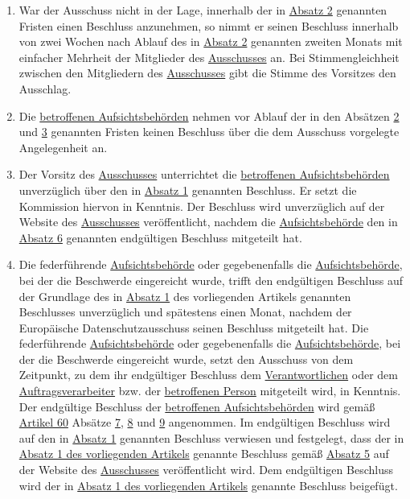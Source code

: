\begin{enumerate}
  \item War der Ausschuss nicht in der Lage, innerhalb der in \hyperref[itm:65-2]{Absatz 2} genannten Fristen einen
   Beschluss anzunehmen, so nimmt er seinen Beschluss innerhalb von zwei Wochen nach Ablauf des in \hyperref[itm:65-2]
   {Absatz 2} genannten zweiten Monats mit einfacher Mehrheit der Mitglieder des \hyperref[ch:68]{Ausschusses} an. Bei Stimmengleichheit
   zwischen den Mitgliedern des \hyperref[ch:68]{Ausschusses} gibt die Stimme des Vorsitzes den Ausschlag.%
  \label{itm:65-3}

  \item Die \hyperref[itm:04-22]{betroffenen Aufsichtsbehörden} nehmen vor Ablauf der in den Absätzen \hyperref
   [itm:65-2]{2} und \hyperref[itm:65-3]{3} genannten Fristen keinen Beschluss über die dem Ausschuss vorgelegte
   Angelegenheit an.%
  \label{itm:65-4}

  \item Der Vorsitz des \hyperref[ch:68]{Ausschusses} unterrichtet die \hyperref[itm:04-22]{betroffenen Aufsichtsbehörden} unverzüglich
   über den in \hyperref[itm:65-1]{Absatz 1} genannten Beschluss. Er setzt die Kommission hiervon in Kenntnis. Der
   Beschluss wird unverzüglich auf der Website des \hyperref[ch:68]{Ausschusses} veröffentlicht, nachdem die \hyperref[itm:04-21]
   {Aufsichtsbehörde} den in \hyperref[itm:65-6]{Absatz 6} genannten endgültigen Beschluss mitgeteilt hat.%
  \label{itm:65-5}

  \item Die federführende \hyperref[itm:04-21]{Aufsichtsbehörde} oder gegebenenfalls die \hyperref[itm:04-21]
   {Aufsichtsbehörde}, bei der die Beschwerde eingereicht wurde, trifft den endgültigen Beschluss auf der Grundlage des
   in \hyperref[itm:65-1]{Absatz 1} des vorliegenden Artikels genannten Beschlusses unverzüglich und spätestens einen
   Monat, nachdem der Europäische Datenschutzausschuss seinen Beschluss mitgeteilt hat. Die federführende \hyperref
   [itm:04-21]{Aufsichtsbehörde} oder gegebenenfalls die \hyperref[itm:04-21]{Aufsichtsbehörde}, bei der die Beschwerde
   eingereicht wurde, setzt den Ausschuss von dem Zeitpunkt, zu dem ihr endgültiger Beschluss dem
   \hyperref[itm:04-7]{Verantwortlichen} oder dem \hyperref[itm:04-8]{Auftragsverarbeiter} bzw. der \hyperref[itm:04-1]
    {betroffenen Person} mitgeteilt wird, in Kenntnis. Der endgültige Beschluss der \hyperref[itm:04-22]
    {betroffenen Aufsichtsbehörden} wird gemäß \hyperref[ch:60]{Artikel 60} Absätze \hyperref[itm:60-7]{7}, \hyperref
    [itm:60-8]{8} und \hyperref[itm:60-9]{9} angenommen. Im endgültigen Beschluss wird auf den in \hyperref[itm:65-1]
    {Absatz 1} genannten Beschluss verwiesen und festgelegt, dass der in \hyperref[itm:65-1]{Absatz 1 des vorliegenden
    Artikels} genannte Beschluss gemäß \hyperref[itm:65-5]{Absatz 5} auf der Website des \hyperref[ch:68]{Ausschusses} veröffentlicht
    wird. Dem endgültigen Beschluss wird der in \hyperref[itm:65-1]{Absatz 1 des vorliegenden Artikels} genannte
    Beschluss beigefügt.%
  \label{itm:65-6}

\end{enumerate}


